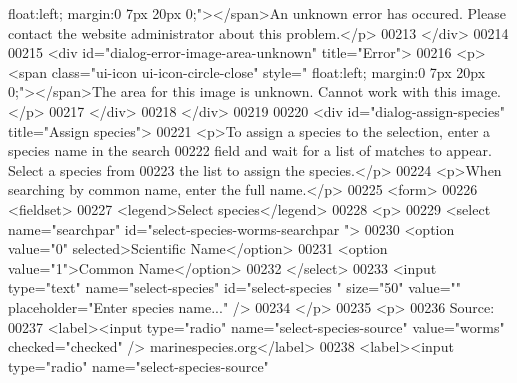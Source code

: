 \begin{DoxyCode}
{      float:left; margin:0 7px 20px 0;"}></span>An unknown error has occured. Please contact the 
      website administrator about \textcolor{keyword}{this} problem.</p>
00213             </div>
00214 
00215             <div \textcolor{keywordtype}{id}=\textcolor{stringliteral}{"dialog-error-image-area-unknown"} title=\textcolor{stringliteral}{"Error"}>
00216                 <p><span \textcolor{keyword}{class}=\textcolor{stringliteral}{"ui-icon ui-icon-circle-close"} style=\textcolor{stringliteral}{"
      float:left; margin:0 7px 20px 0;"}></span>The area \textcolor{keywordflow}{for} \textcolor{keyword}{this} image is unknown. Cannot work 
      with \textcolor{keyword}{this} image.</p>
00217             </div>
00218         </div>
00219 
00220         <div \textcolor{keywordtype}{id}=\textcolor{stringliteral}{"dialog-assign-species"} title=\textcolor{stringliteral}{"Assign species"}>
00221             <p>To assign a species to the selection, enter a species name in 
      the search
00222             field and wait \textcolor{keywordflow}{for} a list of matches to appear. Select a species 
      from
00223             the list to assign the species.</p>
00224             <p>When searching by common name, enter the full name.</p>
00225             <form>
00226             <fieldset>
00227                 <legend>Select species</legend>
00228                 <p>
00229                     <select name=\textcolor{stringliteral}{"searchpar"} \textcolor{keywordtype}{id}=\textcolor{stringliteral}{"select-species-worms-searchpar
      "}>
00230                         <option value=\textcolor{stringliteral}{"0"} selected>Scientific Name</option>
00231                         <option value=\textcolor{stringliteral}{"1"}>Common Name</option>
00232                     </select>
00233                     <input type=\textcolor{stringliteral}{"text"} name=\textcolor{stringliteral}{"select-species"} \textcolor{keywordtype}{id}=\textcolor{stringliteral}{"select-species
      "} size=\textcolor{stringliteral}{"50"} value=\textcolor{stringliteral}{""} placeholder=\textcolor{stringliteral}{"Enter species name..."} />
00234                 </p>
00235                 <p>
00236                     Source:
00237                     <label><input type=\textcolor{stringliteral}{"radio"} name=\textcolor{stringliteral}{"select-species-source"} 
      value=\textcolor{stringliteral}{"worms"} checked=\textcolor{stringliteral}{"checked"} /> marinespecies.org</label>
00238                     <label><input type=\textcolor{stringliteral}{"radio"} name=\textcolor{stringliteral}{"select-species-source"} 

\end{DoxyCode}
